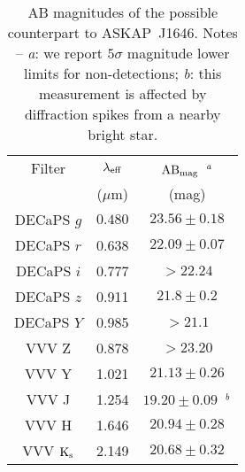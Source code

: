\documentclass[fleqn,usenatbib]{mnras}
\newcommand{\todo}[1]{\textcolor{red}{TODO: #1}\PackageWarning{TODO:}{#1!}}
\newcommand{\blinkyaskap}{{ASKAP}~J1646}
\begin{document}
\begin{table}
    \centering
    \begin{tabular}{ccc}
    \hline
    {Filter} &
    {$\lambda_{\rm eff}$} &
    {${\rm AB}_{\rm mag}$}~$^\text{\textit{a}}$ \\
    {} &
    {($\mu$m)} &
    {(mag)}\\
    \hline \hline
    DECaPS $g$ & $0.480$ & $23.56 \pm 0.18$ \\
    DECaPS $r$ & 0.638 & $22.09 \pm 0.07$ \\
    DECaPS $i$ & 0.777 & $>22.24$ \\
    DECaPS $z$ & 0.911 & $21.8 \pm 0.2$\\
    DECaPS $Y$ & 0.985 & $>21.1$\\
    VVV Z & 0.878 & $>23.20$ \\
    VVV Y & 1.021 & $21.13\pm0.26$ \\
    VVV J & 1.254 & $19.20\pm0.09$~$^\text{\textit{b}}$ \\
    VVV H & 1.646 & $20.94\pm0.28$ \\
    VVV ${\rm K}_{\rm s}$ & 2.149 & $20.68\pm0.32$\\
    \hline
    \end{tabular}
    \caption{AB magnitudes of the possible counterpart to \blinkyaskap{}. Notes -- \textit{a}: we report $5\sigma$ magnitude lower limits for non-detections; \textit{b}: this measurement is affected by diffraction spikes from a nearby bright star.\label{tab:count_tab}}
\end{table}

\end{document}
